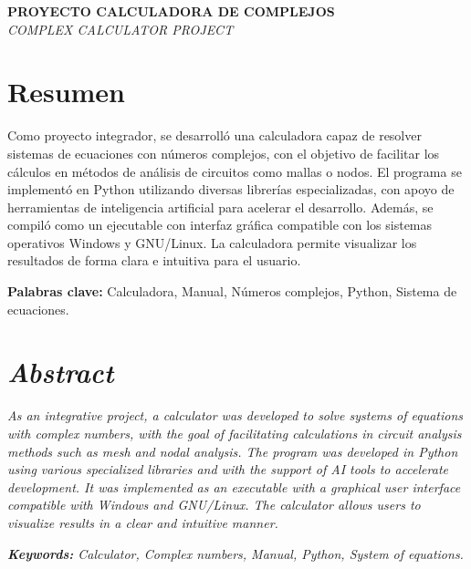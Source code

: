 \documentclass[12pt,a4paper]{article}
\begin{document}
\begingroup
{}
\begin{center}
  {\fontsize{16}{18}\bfseries \MakeUppercase{Proyecto Calculadora de Complejos}}\\[0.5cm]
  {\fontsize{14}{16}\itshape \MakeUppercase{Complex Calculator Project}}\\[1cm]



\end{center}
\endgroup

\section*{Resumen}

Como proyecto integrador, se desarrolló una calculadora capaz de resolver sistemas de ecuaciones con números complejos, con el objetivo de facilitar los cálculos en métodos de análisis de circuitos como mallas o nodos.  
El programa se implementó en Python utilizando diversas librerías especializadas, con apoyo de herramientas de inteligencia artificial para acelerar el desarrollo. Además, se compiló como un ejecutable con interfaz gráfica compatible con los sistemas operativos Windows y GNU/Linux. La calculadora permite visualizar los resultados de forma clara e intuitiva para el usuario.

\noindent \textbf{Palabras clave:} Calculadora, Manual, Números complejos, Python, Sistema de ecuaciones.

\section*{\itshape Abstract}
\textit{
As an integrative project, a calculator was developed to solve systems of equations with complex numbers, with the goal of facilitating calculations in circuit analysis methods such as mesh and nodal analysis. The program was developed in Python using various specialized libraries and with the support of AI tools to accelerate development. It was implemented as an executable with a graphical user interface compatible with Windows and GNU/Linux. The calculator allows users to visualize results in a clear and intuitive manner.
}

\noindent \textit{\textbf{Keywords:} Calculator, Complex numbers, Manual, Python, System of equations.}
\end{document}
